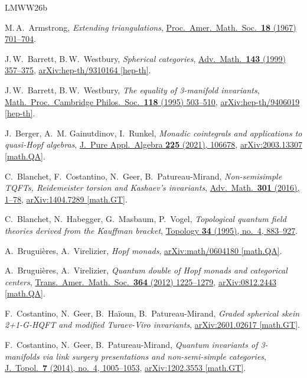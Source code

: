 \documentclass[11pt]{amsart}
\theoremstyle{definition}
\numberwithin{equation}{section}
\newcommand\arxiv[2]      {\href{http://arXiv.org/abs/#1}{arXiv:#2}}
\newcommand\doi[2]        {\href{http://dx.doi.org/#1}{#2}}
\begin{document}
\small

\begin{thebibliography}{LMWW26b}

M.\,A.~Armstrong,
\textsl{Extending triangulations},
\doi{10.2307/2035442}{Proc.\ Amer.\ Math.\ Soc.\ \textbf{18} (1967) 701--704}.

J.\,W.~Barrett, B.\,W.~Westbury,
\textsl{Spherical categories},
\doi{10.1006/aima.1998.1800}{Adv.\ Math.\ \textbf{143} (1999) 357--375},
\arxiv{hep-th/9310164}{hep-th/9310164 [hep-th]}.

J.\,W.~Barrett, B.\,W.~Westbury,
\textsl{The equality of 3-manifold invariants},
\doi{10.1017/S0305004100073825}{Math.\ Proc.\ Cambridge Philos.\ Soc.\ \textbf{118} (1995) 503--510},
\arxiv{hep-th/9406019}{hep-th/9406019 [hep-th]}.

J.~Berger, A.~M. Gainutdinov, I.~Runkel,
\textsl{Monadic cointegrals and applications to quasi-Hopf algebras},
\doi{10.1016/j.jpaa.2021.106678}{J.\ Pure Appl.\ Algebra \textbf{225} (2021), 106678},
\arxiv{2003.13307}{2003.13307 [math.QA]}.

C.~Blanchet, F.~Costantino, N.~Geer, B.~Patureau-Mirand,
\textsl{Non-semisimple TQFTs, Reidemeister torsion and Kashaev's invariants},
\doi{10.1016/j.aim.2016.06.003}{Adv.\ Math.\ \textbf{301} (2016), 1--78},
\arxiv{1404.7289}{1404.7289 [math.GT]}.

C.~Blanchet, N.~Habegger, G.~Masbaum, P.~Vogel,
\textsl{Topological quantum field theories derived from the Kauffman bracket},
\doi{10.1016/0040-9383(94)00051-4}{Topology \textbf{34} (1995), no.~4, 883--927}.

A.~Brugui\`eres, A.~Virelizier,
\textsl{Hopf monads},
\arxiv{math/0604180}{math/0604180 [math.QA]}.

A.~Brugui\`eres, A.~Virelizier,
\textsl{Quantum double of Hopf monads and categorical centers},
\doi{10.1090/S0002-9947-2011-05342-0}{Trans.\ Amer.\ Math.\ Soc.\ \textbf{364} (2012) 1225--1279},
\arxiv{0812.2443}{0812.2443 [math.QA]}.

F.~Costantino, N.~Geer, B.~Ha\"ioun, B.~Patureau-Mirand,
\textsl{Graded spherical skein 2+1-G-HQFT and modified Turaev-Viro invariants},
\arxiv{2601.02617}{2601.02617 [math.GT]}.

F.~Costantino, N.~Geer, B.~Patureau-Mirand,
\textsl{Quantum invariants of 3-manifolds via link surgery presentations and non-semi-simple categories},
\doi{10.1112/jtopol/jtu006}{J.\ Topol.\ \textbf{7} (2014), no.~4, 1005--1053},
\arxiv{1202.3553}{1202.3553 [math.GT]}.


\end{thebibliography}
\end{document}
